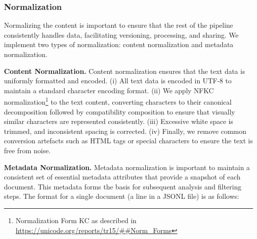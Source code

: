 \subsubsection{Normalization}
\label{sec:pipelines.curated.normalization}
Normalizing the content is important to ensure that the rest of the pipeline consistently handles data, facilitating versioning, processing, and sharing. We implement two types of normalization: content normalization and metadata normalization.



\textbf{Content Normalization.}
Content normalization ensures that the text data is uniformly formatted and encoded. 
(i) All text data is encoded in UTF-8 to maintain a standard character encoding format.
(ii) We apply NFKC normalization\footnote{Normalization Form KC as described in \url{https://unicode.org/reports/tr15/##Norm_Forms}} to the text content, converting characters to their canonical decomposition followed by compatibility composition to ensure that visually similar characters are represented consistently.  
(iii) Excessive white space is trimmed, and inconsistent spacing is corrected. 
(iv) Finally, we remove common conversion artefacts such as HTML tags or special characters to ensure the text is free from noise. 


\textbf{Metadata Normalization.}
Metadata normalization is important to maintain a consistent set of essential metadata attributes that provide a snapshot of each document. This metadata forms the basis for subsequent analysis and filtering steps.
The format for a single document (a line in a JSONL file) is as follows:

